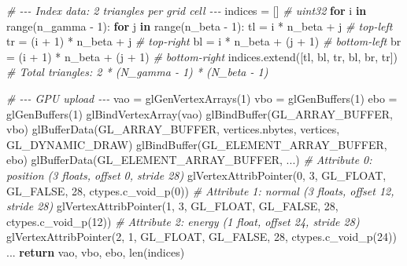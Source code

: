 \documentclass[
  11pt,
]{report}
\newenvironment{Shaded}{}{}
\newcommand{\BuiltInTok}[1]{\textcolor[rgb]{0.00,0.50,0.00}{#1}}
\newcommand{\CommentTok}[1]{\textcolor[rgb]{0.38,0.63,0.69}{\textit{#1}}}
\newcommand{\ControlFlowTok}[1]{\textcolor[rgb]{0.00,0.44,0.13}{\textbf{#1}}}
\newcommand{\DecValTok}[1]{\textcolor[rgb]{0.25,0.63,0.44}{#1}}
\newcommand{\KeywordTok}[1]{\textcolor[rgb]{0.00,0.44,0.13}{\textbf{#1}}}
\newcommand{\NormalTok}[1]{#1}
\newcommand{\OperatorTok}[1]{\textcolor[rgb]{0.40,0.40,0.40}{#1}}
\begin{document}
\begin{Shaded}
\begin{Highlighting}[]
    \CommentTok{\# {-}{-}{-} Index data: 2 triangles per grid cell {-}{-}{-}}
\NormalTok{    indices }\OperatorTok{=}\NormalTok{ []                                     }\CommentTok{\# uint32}
    \ControlFlowTok{for}\NormalTok{ i }\KeywordTok{in} \BuiltInTok{range}\NormalTok{(n\_gamma }\OperatorTok{{-}} \DecValTok{1}\NormalTok{):}
        \ControlFlowTok{for}\NormalTok{ j }\KeywordTok{in} \BuiltInTok{range}\NormalTok{(n\_beta }\OperatorTok{{-}} \DecValTok{1}\NormalTok{):}
\NormalTok{            tl }\OperatorTok{=}\NormalTok{ i }\OperatorTok{*}\NormalTok{ n\_beta }\OperatorTok{+}\NormalTok{ j                      }\CommentTok{\# top{-}left}
\NormalTok{            tr }\OperatorTok{=}\NormalTok{ (i }\OperatorTok{+} \DecValTok{1}\NormalTok{) }\OperatorTok{*}\NormalTok{ n\_beta }\OperatorTok{+}\NormalTok{ j                }\CommentTok{\# top{-}right}
\NormalTok{            bl }\OperatorTok{=}\NormalTok{ i }\OperatorTok{*}\NormalTok{ n\_beta }\OperatorTok{+}\NormalTok{ (j }\OperatorTok{+} \DecValTok{1}\NormalTok{)                }\CommentTok{\# bottom{-}left}
\NormalTok{            br }\OperatorTok{=}\NormalTok{ (i }\OperatorTok{+} \DecValTok{1}\NormalTok{) }\OperatorTok{*}\NormalTok{ n\_beta }\OperatorTok{+}\NormalTok{ (j }\OperatorTok{+} \DecValTok{1}\NormalTok{)          }\CommentTok{\# bottom{-}right}
\NormalTok{            indices.extend([tl, bl, tr, bl, br, tr])}
    \CommentTok{\# Total triangles: 2 * (N\_gamma {-} 1) * (N\_beta {-} 1)}

    \CommentTok{\# {-}{-}{-} GPU upload {-}{-}{-}}
\NormalTok{    vao }\OperatorTok{=}\NormalTok{ glGenVertexArrays(}\DecValTok{1}\NormalTok{)}
\NormalTok{    vbo }\OperatorTok{=}\NormalTok{ glGenBuffers(}\DecValTok{1}\NormalTok{)}
\NormalTok{    ebo }\OperatorTok{=}\NormalTok{ glGenBuffers(}\DecValTok{1}\NormalTok{)}
\NormalTok{    glBindVertexArray(vao)}
\NormalTok{    glBindBuffer(GL\_ARRAY\_BUFFER, vbo)}
\NormalTok{    glBufferData(GL\_ARRAY\_BUFFER, vertices.nbytes, vertices, GL\_DYNAMIC\_DRAW)}
\NormalTok{    glBindBuffer(GL\_ELEMENT\_ARRAY\_BUFFER, ebo)}
\NormalTok{    glBufferData(GL\_ELEMENT\_ARRAY\_BUFFER, ...)}
    \CommentTok{\# Attribute 0: position (3 floats, offset 0, stride 28)}
\NormalTok{    glVertexAttribPointer(}\DecValTok{0}\NormalTok{, }\DecValTok{3}\NormalTok{, GL\_FLOAT, GL\_FALSE, }\DecValTok{28}\NormalTok{, ctypes.c\_void\_p(}\DecValTok{0}\NormalTok{))}
    \CommentTok{\# Attribute 1: normal (3 floats, offset 12, stride 28)}
\NormalTok{    glVertexAttribPointer(}\DecValTok{1}\NormalTok{, }\DecValTok{3}\NormalTok{, GL\_FLOAT, GL\_FALSE, }\DecValTok{28}\NormalTok{, ctypes.c\_void\_p(}\DecValTok{12}\NormalTok{))}
    \CommentTok{\# Attribute 2: energy (1 float, offset 24, stride 28)}
\NormalTok{    glVertexAttribPointer(}\DecValTok{2}\NormalTok{, }\DecValTok{1}\NormalTok{, GL\_FLOAT, GL\_FALSE, }\DecValTok{28}\NormalTok{, ctypes.c\_void\_p(}\DecValTok{24}\NormalTok{))}
\NormalTok{    ...}
    \ControlFlowTok{return}\NormalTok{ vao, vbo, ebo, }\BuiltInTok{len}\NormalTok{(indices)}



\end{Highlighting}
\end{Shaded}
\end{document}
